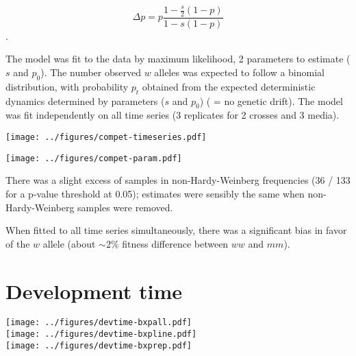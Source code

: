 \documentclass[10pt]{article}
\begin{document}
$$\Delta p = p \frac{1-\frac{s}{2}(1-p)}{1-s(1-p)}$$. 

The model was fit to the data by maximum likelihood, 2 parameters to estimate ($s$ and $p_0$). The number observed $w$ alleles was expected to follow a binomial distribution, with probability $p_t$ obtained from the expected deterministic dynamics determined by parameters ($s$ and $p_0$) ( = no genetic drift). The model was fit independently on all time series (3 replicates for 2 crosses and 3 media). 

\begin{center}
    \texttt{[image: ../figures/compet-timeseries.pdf]}
\end{center}

\begin{center}
    \texttt{[image: ../figures/compet-param.pdf]}
\end{center}

There was a slight excess of samples in non-Hardy-Weinberg frequencies (36 / 133 for a p-value threshold at 0.05); estimates were sensibly the same when non-Hardy-Weinberg samples were removed.

\begin{minipage}{\linewidth}\end{minipage}

\vspace{0.5cm}

When fitted to all time series simultaneously, there was a significant bias in favor of the $w$ allele (about $\sim 2\%$ fitness difference between $ww$ and $mm$). 

\section{Development time}

\begin{center}
    \texttt{[image: ../figures/devtime-bxpall.pdf]} \\
    \texttt{[image: ../figures/devtime-bxpline.pdf]} \\
    \texttt{[image: ../figures/devtime-bxprep.pdf]}    
\end{center}

\begin{minipage}{\linewidth}\end{minipage}
\end{document}
